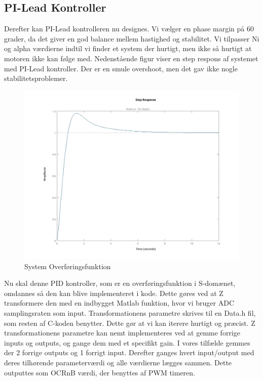 \documentclass[../main.tex]{subfiles}
\begin{document}
\subsection{PI-Lead Kontroller}
Derefter kan PI-Lead kontrolleren nu designes. Vi vælger en phase margin på 60 grader, da det giver en god balance mellem hastighed og stabilitet. Vi tilpasser Ni og alpha værdierne indtil vi finder et system der hurtigt, men ikke så hurtigt at motoren ikke kan følge med. Nedenstående figur viser en step respons af systemet med PI-Lead kontroller. Der er en smule overshoot, men det gav ikke nogle stabilitetsproblemer.

\begin{figure}[H]
      \includegraphics[width=\textwidth]{Dokumentation/Figures/Motor PID Step Response.jpg}
     \caption{System Overføringsfunktion}
     \label{fig: System Overføringsfunktion}
     \end{figure}

Nu skal denne PID kontroller, som er en overføringsfunktion i S-domænet, omdannes så den kan blive implementeret i kode. Dette gøres ved at Z transformere den med en indbygget Matlab funktion, hvor vi bruger ADC samplingsraten som input. Transformationens parametre skrives til en Data.h fil, som resten af C-koden benytter. Dette gør at vi kan iterere hurtigt og præcist. Z transformationens parametre kan nemt implementeres ved at gemme forrige inputs og outputs, og gange dem med et specifikt gain. I vores tilfælde gemmes der 2 forrige outputs og 1 forrigt input. Derefter ganges hvert input/output med deres tilhørende parameterværdi og alle værdierne lægges sammen. Dette outputtes som OCRnB værdi, der benyttes af PWM timeren.
\end{document}
